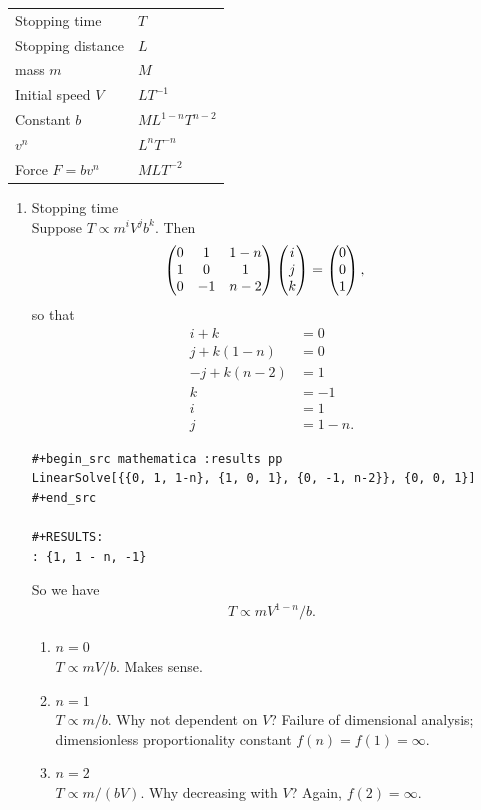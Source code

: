 \begin{tabular}{l|l}
  Stopping time     & $T$ \\
  Stopping distance & $L$ \\
  \hline
  mass $m$          & $M$ \\
  Initial speed $V$ & $LT^{-1}$ \\
  Constant $b$      & $ML^{1-n}T^{n-2}$ \\
  \hline
  $v^n$             & $L^nT^{-n}$ \\
  Force $F = bv^n$  & $MLT^{-2}$
\end{tabular}

\begin{enumerate}[label=(\alph*)]
\item Stopping time\\
  Suppose $T \propto m^iV^jb^k$. Then
  \begin{align*}
    \begin{pmatrix}0 & 1 & 1-n\\1 & 0 & 1\\0 & -1 & n-2\\ \end{pmatrix} \begin{pmatrix}i\\j\\k\end{pmatrix} &= \begin{pmatrix}0\\0\\1\end{pmatrix},
  \end{align*}
  so that
  \begin{align*}
    i + k &= 0 \\
    j + k(1 - n) &= 0 \\
    -j + k(n - 2) &= 1 \\
    k &= -1 \\
    i &= 1 \\
    j &= 1 - n.
  \end{align*}

\begin{verbatim}
#+begin_src mathematica :results pp
LinearSolve[{{0, 1, 1-n}, {1, 0, 1}, {0, -1, n-2}}, {0, 0, 1}]
#+end_src

#+RESULTS:
: {1, 1 - n, -1}
\end{verbatim}

  So we have
  \begin{align*}
    T \propto mV^{1 - n}/b.
  \end{align*}

  \begin{enumerate}
  \item $n = 0$\\
    $T \propto mV/b$. Makes sense.
  \item $n = 1$\\
    $T \propto m/b$. Why not dependent on $V$? Failure of dimensional analysis; dimensionless
    proportionality constant $f(n) = f(1) = \infty$.
  \item $n = 2$\\
    $T \propto m/(bV)$. Why decreasing with $V$? Again, $f(2) = \infty$.
  \end{enumerate}


\end{enumerate}
